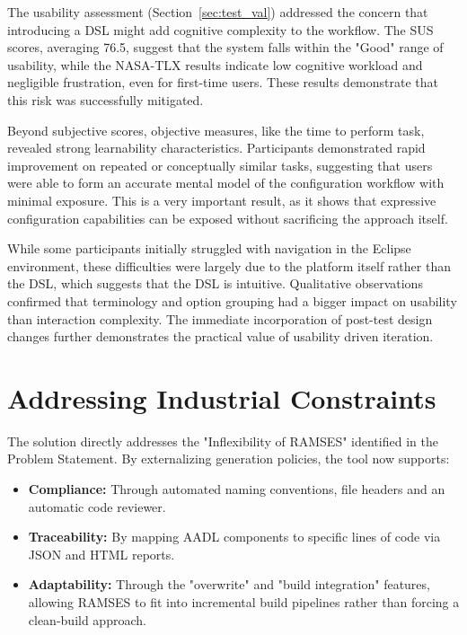 The usability assessment (Section~\ref{sec:test_val}) addressed the concern that introducing a \gls{DSL} might add cognitive complexity to the workflow. The \gls{SUS} scores, averaging 76.5, suggest that the system falls within the "Good" range of usability, while the NASA-\gls{TLX} results indicate low cognitive workload and negligible frustration, even for first-time users. These results demonstrate that this risk was successfully mitigated.

Beyond subjective scores, objective measures, like the time to perform task, revealed strong learnability characteristics. Participants demonstrated rapid improvement on repeated or conceptually similar tasks, suggesting that users were able to form an accurate mental model of the configuration workflow with minimal exposure. This is a very important result, as it shows that expressive configuration capabilities can be exposed without sacrificing the approach itself.

While some participants initially struggled with navigation in the Eclipse environment, these difficulties were largely due to the platform itself rather than the \gls{DSL}, which suggests that the \gls{DSL} is intuitive. Qualitative observations confirmed that terminology and option grouping had a bigger impact on usability than interaction complexity. The immediate incorporation of post-test design changes further demonstrates the practical value of usability driven iteration.


\section{Addressing Industrial Constraints}
\label{sec:industrial_constraints}

The solution directly addresses the "Inflexibility of \gls{RAMSES}" identified in the Problem Statement. By externalizing generation policies, the tool now supports:

\begin{itemize} 
	\item \textbf{Compliance: } Through automated naming conventions, file headers and an automatic code reviewer.
	\item \textbf{Traceability: } By mapping \gls{AADL} components to specific lines of code via \gls{JSON} and \gls{HTML} reports.
	\item \textbf{Adaptability: } Through the "overwrite" and "build integration" features, allowing \gls{RAMSES} to fit into incremental build pipelines rather than forcing a clean-build approach.
\end{itemize}

